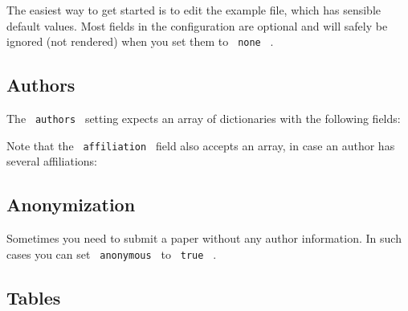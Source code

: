 The easiest way to get started is to edit the example file, which has
sensible default values. Most fields in the configuration are optional
and will safely be ignored (not rendered) when you set them to
\texttt{\ none\ } .

\subsection{Authors}\label{authors}

The \texttt{\ authors\ } setting expects an array of dictionaries with
the following fields:

\begin{Shaded}
\begin{Highlighting}[]
\NormalTok{(}
\NormalTok{)}
\end{Highlighting}
\end{Shaded}

Note that the \texttt{\ affiliation\ } field also accepts an array, in
case an author has several affiliations:

\begin{Shaded}
\begin{Highlighting}[]
\NormalTok{(}
\NormalTok{)}
\end{Highlighting}
\end{Shaded}

\subsection{Anonymization}\label{anonymization}

Sometimes you need to submit a paper without any author information. In
such cases you can set \texttt{\ anonymous\ } to \texttt{\ true\ } .

\subsection{Tables}\label{tables}

